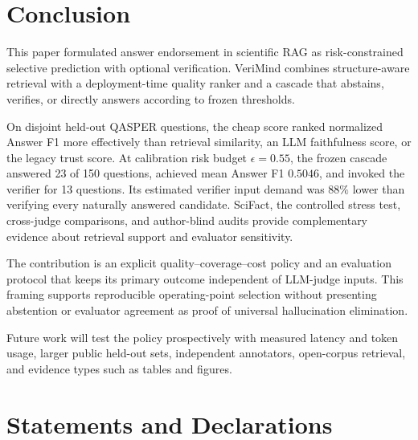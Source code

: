 \documentclass[smallextended]{svjour3}
\begin{document}
\section{Conclusion}
\label{sec:conclusion}

This paper formulated answer endorsement in scientific RAG as risk-constrained selective prediction with optional verification. VeriMind combines structure-aware retrieval with a deployment-time quality ranker and a cascade that abstains, verifies, or directly answers according to frozen thresholds.

On disjoint held-out QASPER questions, the cheap score ranked normalized Answer F1 more effectively than retrieval similarity, an LLM faithfulness score, or the legacy trust score. At calibration risk budget $\epsilon=0.55$, the frozen cascade answered 23 of 150 questions, achieved mean Answer F1 $0.5046$, and invoked the verifier for 13 questions. Its estimated verifier input demand was $88\%$ lower than verifying every naturally answered candidate. SciFact, the controlled stress test, cross-judge comparisons, and author-blind audits provide complementary evidence about retrieval support and evaluator sensitivity.

The contribution is an explicit quality--coverage--cost policy and an evaluation protocol that keeps its primary outcome independent of LLM-judge inputs. This framing supports reproducible operating-point selection without presenting abstention or evaluator agreement as proof of universal hallucination elimination.

Future work will test the policy prospectively with measured latency and token usage, larger public held-out sets, independent annotators, open-corpus retrieval, and evidence types such as tables and figures.

\section*{Statements and Declarations}
\end{document}
